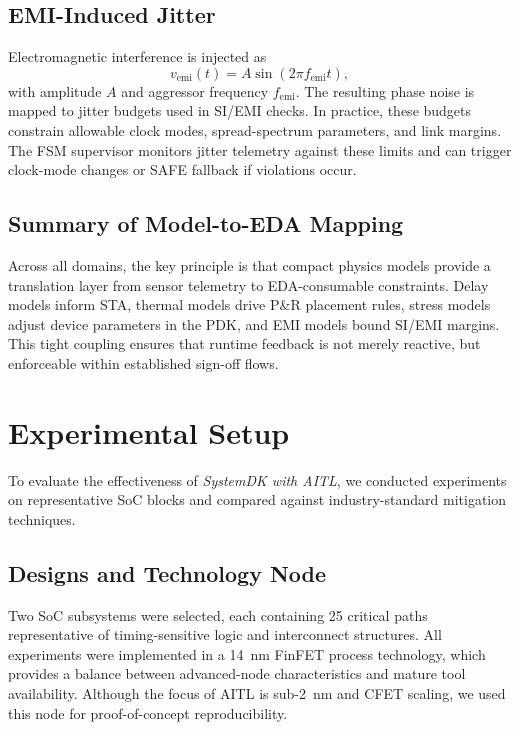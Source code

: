 \documentclass[conference]{IEEEtran}
\begin{document}
\subsection{EMI-Induced Jitter}
Electromagnetic interference is injected as
\begin{equation}
v_{\mathrm{emi}}(t)=A\sin (2\pi f_{\mathrm{emi}} t),
\end{equation}
with amplitude $A$ and aggressor frequency $f_{\mathrm{emi}}$. The resulting phase noise is mapped to jitter budgets used in SI/EMI checks. In practice, these budgets constrain allowable clock modes, spread-spectrum parameters, and link margins. The FSM supervisor monitors jitter telemetry against these limits and can trigger clock-mode changes or SAFE fallback if violations occur.

\subsection{Summary of Model-to-EDA Mapping}
Across all domains, the key principle is that compact physics models provide a translation layer from sensor telemetry to EDA-consumable constraints. Delay models inform STA, thermal models drive P\&R placement rules, stress models adjust device parameters in the PDK, and EMI models bound SI/EMI margins. This tight coupling ensures that runtime feedback is not merely reactive, but enforceable within established sign-off flows.

\section{Experimental Setup}

To evaluate the effectiveness of \emph{SystemDK with AITL}, we conducted experiments on representative SoC blocks and compared against industry-standard mitigation techniques.

\subsection{Designs and Technology Node}
Two SoC subsystems were selected, each containing 25 critical paths representative of timing-sensitive logic and interconnect structures. All experiments were implemented in a \SI{14}{\nano\meter} FinFET process technology, which provides a balance between advanced-node characteristics and mature tool availability. Although the focus of AITL is sub-\SI{2}{\nano\meter} and CFET scaling, we used this node for proof-of-concept reproducibility.
\end{document}
